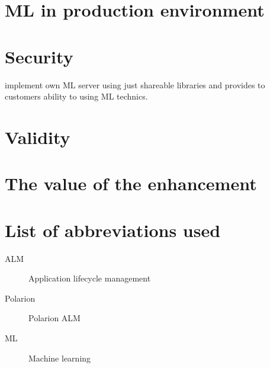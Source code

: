 \documentclass[thesis=M,english]{FITthesis}[2012/06/26]
\begin{document}
\chapter{ML in production environment}

\chapter{Security}

implement own ML server using just shareable libraries and provides to customers ability to using ML technics.

\chapter{Validity}

\chapter{The value of the enhancement}

\begin{conclusion}
\end{conclusion}




\appendix

\chapter{List of abbreviations used}

\printglossaries

\begin{description}
	\item[ALM] Application lifecycle management
	\item[Polarion] Polarion ALM
	\item[ML] Machine learning 
\end{description}
\end{document}
